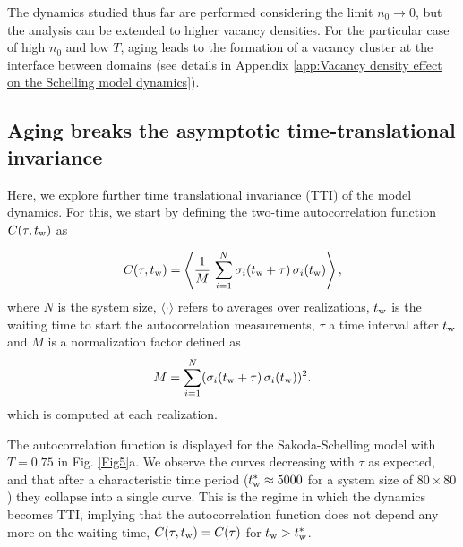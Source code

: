 The dynamics studied thus far are performed considering the limit $n_0 \to 0$, but the analysis can be extended to higher vacancy densities. For the particular case of high $n_0$ and low $T$, aging leads to the formation of a vacancy cluster at the interface between domains (see details in Appendix \ref{app:Vacancy density effect on the Schelling model dynamics}).

\subsection{Aging breaks the asymptotic time-translational invariance}

Here, we explore further time translational invariance (TTI) of the model dynamics. For this, we start by defining the two-time autocorrelation function $C(\tau,t_{\rm{w}})$ \cite{spinglassbook} as

\begin{equation}
    C(\tau,t_{\rm{w}}) = \left\langle \frac{1}{M} \, \sum_{i = 1}^{N}  \sigma_i (t_{\rm{w}} + \tau) \,  \sigma_i(t_{\rm{w}}) \right\rangle ,
\end{equation}
where $N$ is the system size,  $\langle \cdot \rangle$ refers to averages over realizations, $t_{\rm{w}}$ is the waiting time to start the autocorrelation measurements, $\tau$ a time interval after $t_{\rm{w}}$ and $M$ is a normalization factor defined as
\begin{equation}
M =  \sum_{i = 1}^{N}  (\sigma_i (t_{\rm{w}} + \tau) \, \sigma_i(t_{\rm{w}}))^2 . 
\end{equation}
which is computed at each realization. 

The autocorrelation function is displayed for the Sakoda-Schelling model with $T = 0.75$ in Fig. \ref{Fig5}a. We observe the curves decreasing with $\tau$ as expected, and that after a characteristic time period ($t_{\rm{w}}^* \approx 5000$ for a system size of $80\times 80$) they collapse into a single curve. This is the regime in which the dynamics becomes TTI, implying that the autocorrelation function does not depend any more on the waiting time, $C(\tau,t_{\rm{w}}) = C(\tau)$ for $ t_{\rm{w}} > t_{\rm{w}}^{*}$. 

